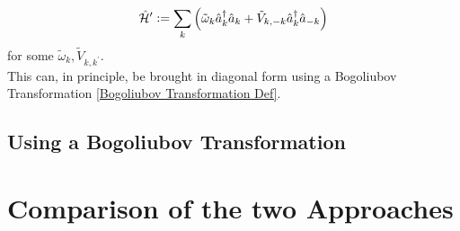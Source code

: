 \begin{equation}
\hat{\mathcal{H}}^\prime \vcentcolon= \sum\limits_{k}\left(\tilde\omega_k \hat a^\dagger_k\hat a_k + \tilde V_{k,-k}\hat a^\dagger_k\hat a_{-k}\right)
\end{equation}
for some $\tilde\omega_k,\tilde V_{k,k^\prime}$.\\
This can, in principle, be brought in diagonal form using a Bogoliubov Transformation \ref{Bogoliubov Transformation Def}.  
\subsection{Using a Bogoliubov Transformation}
\section{Comparison of the two Approaches}